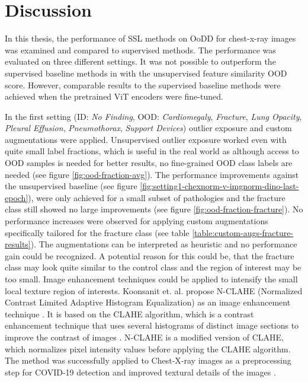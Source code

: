 \section{Discussion}
\label{section: discussion}
In this thesis, the performance of SSL methods on OoDD for chest-x-ray images was examined and compared to supervised methods.
The performance was evaluated on three different settings.
It was not possible to outperform the supervised baseline methods in \citep{Berger2021} with the unsupervised feature similarity OOD score.
However, comparable results to the supervised baseline methods were achieved when the pretrained ViT encoders were fine-tuned.
\par
In the first setting (ID: \textit{No Finding}, OOD: \textit{Cardiomegaly}, \textit{Fracture}, \textit{Lung Opacity}, \textit{Pleural Effusion}, \textit{Pneumothorax}, \textit{Support Devices}) outlier exposure and custom augmentations were applied.
Unsupervised outlier exposure worked even with quite small label fractions, which is useful in the real world as although access to OOD samples is needed for better results, no fine-grained OOD class labels are needed (see figure \ref{fig:ood-fraction-avg}).
The performance improvements against the unsupervised baseline (see figure \ref{fig:setting1-chexnorm-v-imgnorm-dino-last-epoch}), were only achieved for a small subset of pathologies and the fracture class still showed no large improvements (see figure \ref{fig:ood-fraction-fracture}).
No performance increases were observed for applying custom augmentations specifically tailored for the fracture class (see table \ref{table:custom-augs-fracture-results}).
The augmentations can be interpreted as heuristic and no performance gain could be recognized.
A potential reason for this could be, that the fracture class may look quite similar to the control class and the region of interest may be too small. 
Image enhancement techniques could be applied to intensify the small local texture region of interests.
Koonsanit et. al. propose N-CLAHE (Normalized Contrast Limited Adaptive Histogram Equalization) as an image enhancement technique \citep{Koonsanit2017}.
It is based on the CLAHE algorithm, which is a contrast enhancement technique that uses several histograms of distinct image sections to improve the contrast of images \citep{Zuiderveld1994}.
N-CLAHE is a modified version of CLAHE, which normalizes pixel intensity values before applying the CLAHE algorithm.
The method was successfully applied to Chest-X-ray images as a preprocessing step for COVID-19 detection and improved textural details of the images \citep{Horry2020}.
